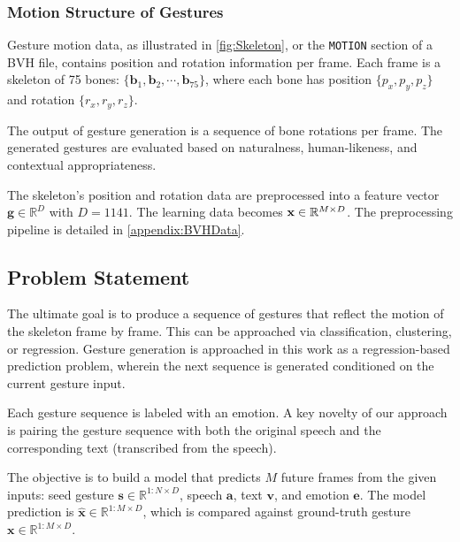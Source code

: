 \subsubsection{Motion Structure of Gestures}

Gesture motion data, as illustrated in \autoref{fig:Skeleton}, or the \texttt{MOTION} section of a BVH file, contains position and rotation information per frame. Each frame is a skeleton of 75 bones: $\{ \mathbf{b}_{1}, \mathbf{b}_{2}, \cdots , \mathbf{b}_{75} \}$, where each bone has position $\{ p_{x}, p_{y}, p_{z} \}$ and rotation $\{ r_{x}, r_{y}, r_{z} \}$.

The output of gesture generation is a sequence of bone rotations per frame. The generated gestures are evaluated based on naturalness, human-likeness, and contextual appropriateness.

The skeleton's position and rotation data are preprocessed into a feature vector $\mathbf{g} \in \mathbb{R}^{D}$ with $D = 1141$. The learning data becomes $\mathbf{x} \in \mathbb{R}^{M \times D}$. The preprocessing pipeline is detailed in \autoref{appendix:BVHData}.

\subsection{Problem Statement}
\label{sec:ProblemStatement}

The ultimate goal is to produce a sequence of gestures that reflect the motion of the skeleton frame by frame. This can be approached via classification, clustering, or regression. Gesture generation is approached in this work as a regression-based prediction problem, wherein the next sequence is generated conditioned on the current gesture input.


Each gesture sequence is labeled with an emotion. A key novelty of our approach is pairing the gesture sequence with both the original speech and the corresponding text (transcribed from the speech).

The objective is to build a model that predicts $M$ future frames from the given inputs: seed gesture $\mathbf{s} \in \mathbb{R}^{1:N \times D}$, speech $\mathbf{a}$, text $\mathbf{v}$, and emotion $\mathbf{e}$. The model prediction is $\hat{\mathbf{x}} \in \mathbb{R}^{1:M \times D}$, which is compared against ground-truth gesture $\mathbf{x} \in \mathbb{R}^{1:M \times D}$.


